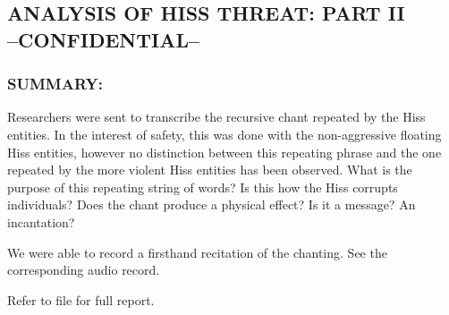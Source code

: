 \subsection*{ANALYSIS OF HISS THREAT: PART II\\
	--CONFIDENTIAL--}
\subsubsection*{SUMMARY:}
\par Researchers were sent to transcribe the recursive chant repeated
by the Hiss entities. In the interest of safety, this was done with
the non-aggressive floating Hiss entities, however no distinction
between this repeating phrase and the one repeated by the more
violent Hiss entities has been observed. What is the purpose of
this repeating string of words? Is this how the Hiss corrupts
individuals? Does the chant produce a physical effect? Is it a
message? An incantation?
\par We were able to record a firsthand recitation of the chanting. See
the corresponding audio record.
\par Refer to file  for full report.